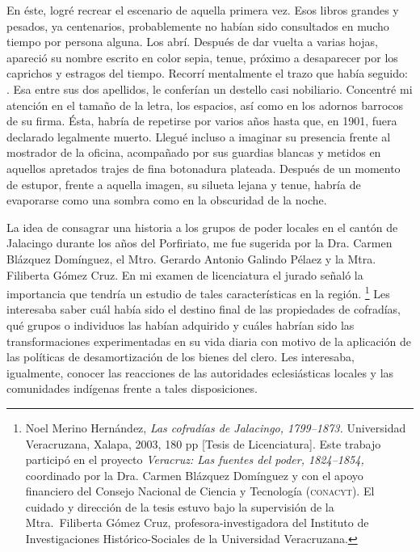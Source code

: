 \documentclass[14pt,twoside,final]{extbook} %
\let\oldfootnote\footnote
\renewcommand\footnote[1]{%
\oldfootnote{\hspace{1mm}#1}}
\begin{document}
En éste, logré recrear el escenario de aquella primera vez. Esos libros grandes y pesados, ya centenarios, probablemente no habían sido consultados en mucho tiempo por persona alguna. Los abrí. Después de dar vuelta a varias hojas, apareció su nombre escrito en color sepia, tenue, próximo a desaparecer por los caprichos y estragos del tiempo. Recorrí mentalmente el trazo que había seguido: . Esa \kern5pt entre sus dos apellidos, le conferían un destello casi nobiliario. Concentré mi atención en el tamaño de la letra, los espacios, así como en los adornos barrocos de su firma. Ésta, habría de repetirse por varios años hasta que, en 1901, fuera declarado legalmente muerto. Llegué incluso a imaginar su presencia frente al mostrador de la oficina, acompañado por sus guardias blancas y metidos en aquellos apretados trajes de fina botonadura plateada. Después de un momento de estupor, frente a aquella imagen, su silueta lejana y tenue, habría de evaporarse como una sombra como en la obscuridad de la noche.

La idea de consagrar una historia a los grupos de poder locales en el cantón de Jalacingo durante los años del Porfiriato, me fue sugerida por la Dra. Carmen Blázquez Domínguez, el Mtro. Gerardo Antonio Galindo Pélaez y la Mtra. Filiberta Gómez Cruz. En mi examen de licenciatura el jurado señaló la importancia que tendría un estudio de tales características en la región.\footnote{Noel Merino Hernández, \emph{Las cofradías de Jalacingo, 1799--1873.} Universidad Veracruzana, Xalapa, 2003, 180 pp [Tesis de Licenciatura]. Este trabajo participó en el proyecto \emph{Veracruz: Las fuentes del poder, 1824--1854,} coordinado por la Dra. Carmen Blázquez Domínguez y con el apoyo financiero del Consejo Nacional de Ciencia y Tecnología (\textsc{conacyt}). El cuidado y dirección de la tesis estuvo bajo la supervisión de la Mtra.~Filiberta Gómez Cruz, profesora-investigadora del Instituto de Investigaciones Histórico-Sociales de la Universidad Veracruzana.} Les interesaba saber cuál había sido el destino final de las propiedades de cofradías, qué grupos o individuos las habían adquirido y cuáles habrían sido las transformaciones experimentadas en su vida diaria con motivo de la aplicación de las políticas de desamortización de los bienes del clero. Les interesaba, igualmente, conocer las reacciones de las autoridades eclesiásticas locales y las comunidades indígenas frente a tales disposiciones.
\end{document}
